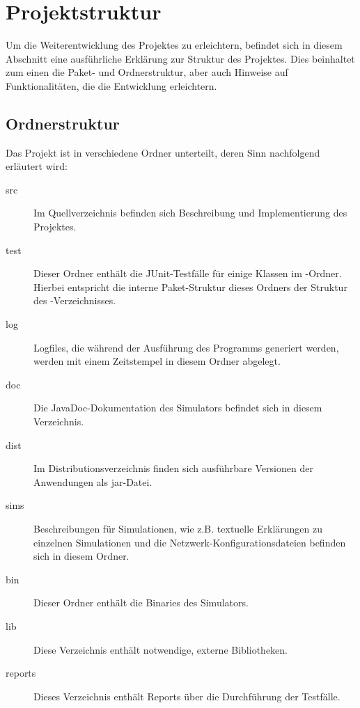 \section{Projektstruktur}\label{sec:appendix_structure}
Um die Weiterentwicklung des Projektes zu erleichtern, befindet sich in diesem Abschnitt eine ausführliche Erklärung zur Struktur des Projektes. Dies beinhaltet zum einen die Paket- und Ordnerstruktur, aber auch Hinweise auf Funktionalitäten, die die Entwicklung erleichtern.
\subsection{Ordnerstruktur}
Das Projekt ist in verschiedene Ordner unterteilt, deren Sinn nachfolgend erläutert wird:
\begin{description}
	\item[src] Im Quellverzeichnis befinden sich Beschreibung und Implementierung des Projektes.
	\item[test] Dieser Ordner enthält die JUnit-Testfälle für einige Klassen im -Ordner. Hierbei entspricht die interne Paket-Struktur dieses Ordners der Struktur des -Verzeichnisses.
	\item[log] Logfiles, die während der Ausführung des Programms generiert werden, werden mit einem Zeitstempel in diesem Ordner abgelegt.
	\item[doc] Die JavaDoc-Dokumentation des Simulators befindet sich in diesem Verzeichnis.
	\item[dist] Im Distributionsverzeichnis finden sich ausführbare Versionen der Anwendungen als jar-Datei.
	\item[sims] Beschreibungen für Simulationen, wie z.B. textuelle Erklärungen zu einzelnen Simulationen und die Netzwerk-Konfigurationsdateien befinden sich in diesem Ordner.
	\item[bin] Dieser Ordner enthält die Binaries des Simulators.
	\item[lib] Diese Verzeichnis enthält notwendige, externe Bibliotheken.
	\item[reports] Dieses Verzeichnis enthält Reports über die Durchführung der Testfälle.
\end{description}
